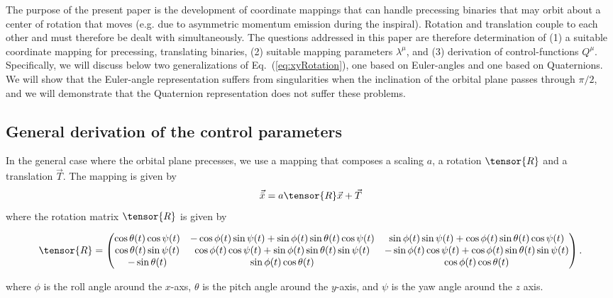 \documentclass[aps, prd, amsmath, floats, floatfix, twocolumn,superscriptaddress, nofootinbib, showpacs]{revtex4-1}
\theoremstyle{plain}
\theoremstyle{definition}
\begin{document}
The purpose of the present paper is the development of coordinate
mappings that can handle precessing binaries that may orbit about a
center of rotation that moves (e.g. due to asymmetric momentum
emission during the inspiral).  Rotation and translation couple to
each other and must therefore be dealt with simultaneously.  The
questions addressed in this paper are therefore determination of (1) a
suitable coordinate mapping for precessing, translating binaries, (2)
suitable mapping parameters $\lambda^\mu$, and (3) derivation of
control-functions $Q^\mu$.  Specifically, we will discuss below two
generalizations of Eq.~(\ref{eq:xyRotation}), one based on
Euler-angles and one based on Quaternions.  We will show that the
Euler-angle representation suffers from singularities when the
inclination of the orbital plane passes through $\pi/2$, and we will
demonstrate that the Quaternion representation does not suffer these
problems.


\subsection{General derivation of the control parameters}

In the general case where the orbital plane precesses, we use a
mapping that composes a scaling $a$, a rotation $\tensor{R}$ and a
translation $\vec{T}$.  The mapping is given by
\begin{equation}\label{eq:3dMap}
\vec{\bar{x}} = a \tensor{R} \vec{x} + \vec{T}
\end{equation}
where the rotation matrix $\tensor{R}$ is given by
\begin{widetext}
\begin{equation}\label{eq:EulerRotation}
\tensor{R} = \begin{pmatrix}
\cos{\theta(t)} \cos{\psi(t)} & 
- \cos{\phi(t)} \sin{\psi(t)} + \sin{\phi(t)} \sin{\theta(t)} \cos{\psi(t)} &
\sin{\phi(t)} \sin{\psi(t)} + \cos{\phi(t)} \sin{\theta(t)} \cos{\psi(t)} \\
\cos{\theta(t)} \sin{\psi(t)} & 
\cos{\phi(t)} \cos{\psi(t)} + \sin{\phi(t)} \sin{\theta(t)} \sin{\psi(t)} & 
- \sin{\phi(t)} \cos{\psi(t)} +\cos{\phi(t)} \sin{\theta(t)} \sin{\psi(t)}  \\
-\sin{\theta(t)} &
\sin{\phi(t)} \cos{\theta(t)} &
\cos{\phi(t)} \cos{\theta(t)} 
\end{pmatrix}.
\end{equation}
\end{widetext}
where $\phi$ is the roll angle around the $x$-axs, $\theta$ is the
pitch angle around the $y$-axis, and $\psi$ is the yaw angle around the
$z$ axis.  
\end{document}
